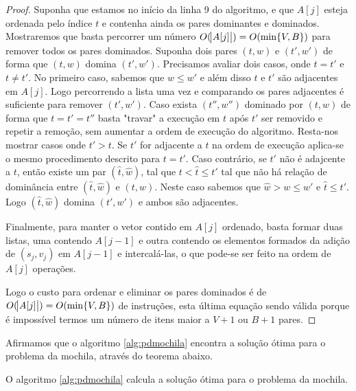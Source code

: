 \begin{proof}
Suponha que estamos no início da linha 9 do algoritmo, e que $A[j]$ esteja ordenada pelo índice $t$ e contenha ainda os pares dominantes e dominados. Mostraremos que basta percorrer um número $O(\abs{A[j]}) = O(\min\{V,B\})$ para remover todos os pares dominados. Suponha dois pares $(t,w)$ e $(t',w')$ de forma que $(t,w)$ domina $(t',w')$.
Precisamos avaliar dois casos, onde $t=t'$ e $t \neq t'$. No primeiro caso, sabemos que $w \leq w'$ e além disso $t$ e $t'$ são adjacentes em $A[j]$. Logo percorrendo a lista uma vez e comparando os pares adjacentes é suficiente para remover $(t',w')$. Caso exista $(t'',w'')$ dominado por $(t,w)$ de forma que $t=t'=t''$ basta "travar" a execução em $t$ após $t'$ ser removido e repetir a remoção, sem aumentar a ordem de execução do algoritmo.
Resta-nos mostrar casos onde $t' > t$. Se $t'$ for adjacente a $t$ na ordem de execução aplica-se o mesmo procedimento descrito para $t=t'$. Caso contrário, se $t'$ não é adajcente a $t$, então existe um par $(\hat{t}, \hat{w})$, tal que $t < \hat{t} \leq t'$ tal que não há relação de dominância entre $(\hat{t}, \hat{w})$ e $(t,w)$. Neste caso sabemos que $\hat{w} > w \leq w'$ e $\hat{t} \leq t'$. Logo $(\hat{t}, \hat{w})$ domina $(t',w')$ e ambos são adjacentes. 

Finalmente, para manter o vetor contido em $A[j]$ ordenado, basta formar duas listas, uma contendo $A[j-1]$ e outra contendo os elementos formados da adição de $(s_j,v_j)$ em $A[j-1]$ e intercalá-las, o que pode-se ser feito na ordem de $A[j]$ operações.

Logo o custo para ordenar e eliminar os pares dominados é de $O(\abs{A[j]}) = O(\min\{V,B\})$ de instruções, esta última equação sendo válida porque é impossível termos um número de itens maior a $V+1$ ou $B+1$ pares.
\end{proof}

Afirmamos que o algoritmo \ref{alg:pdmochila} encontra a solução ótima para o problema da mochila, através do teorema abaixo.

\begin{teorema}
O algoritmo \ref{alg:pdmochila} calcula a solução ótima para o problema da mochila.
\end{teorema}

